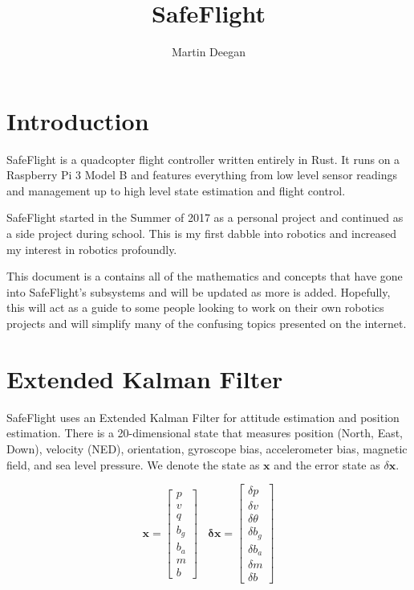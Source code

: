 \documentclass[11pt]{article}
\renewcommand{\vec}[1]{\mathbf{#1}}
\begin{document}
 
 
\title{SafeFlight}
\author{Martin Deegan}
\maketitle

\tableofcontents

\section{Introduction}

SafeFlight is a quadcopter flight controller written entirely in Rust. It runs on a Raspberry Pi 3 Model B and features everything from low level sensor readings and management up to high level state estimation and flight control.

SafeFlight started in the Summer of 2017 as a personal project and continued as a side project during school. This is my first dabble into robotics and increased my interest in robotics profoundly.

This document is a contains all of the mathematics and concepts that have gone into SafeFlight's subsystems and will be updated as more is added. Hopefully, this will act as a guide to some people looking to work on their own robotics projects and will simplify many of the confusing topics presented on the internet.

\section{Extended Kalman Filter}
SafeFlight uses an Extended Kalman Filter for attitude estimation and position estimation. There is a 20-dimensional state that measures position (North, East, Down), velocity (NED), orientation, gyroscope bias, accelerometer bias, magnetic field, and sea level pressure. We denote the state as $\vec{x}$ and the error state as $\delta \vec{x}$.

$$\vec{x} = \begin{bmatrix}
p\\ v\\ q\\ b_g\\ b_a\\ m\\ b
\end{bmatrix}~~~~ \vec{\delta x} = \begin{bmatrix}
\delta p\\
\delta v\\
\delta \theta\\
\delta b_g\\
\delta b_a\\
\delta m \\
\delta b
\end{bmatrix}$$
\end{document}
